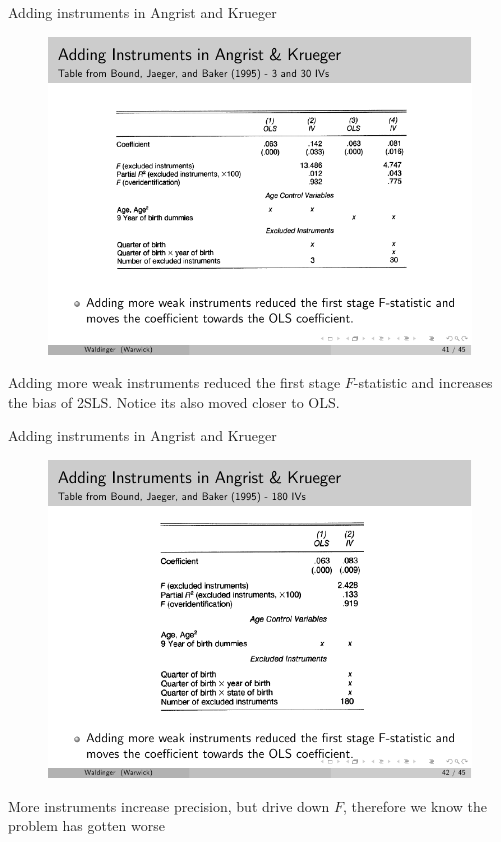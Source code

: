 \documentclass{beamer}
\begin{document}
\begin{frame}{Adding instruments in Angrist and Krueger}
	
	\begin{figure}
	\includegraphics{./lecture_includes/ak_iv1.pdf}
	\end{figure}
	
Adding more weak instruments reduced the first stage $F$-statistic and increases the bias of 2SLS. Notice its also moved closer to OLS. 
	
\end{frame}

\begin{frame}{Adding instruments in Angrist and Krueger}
	
	\begin{figure}
	\includegraphics{./lecture_includes/ak_iv2.pdf}
	\end{figure}
	
More instruments increase precision, but drive down $F$, therefore we know the problem has gotten worse
	
\end{frame}
\end{document}
